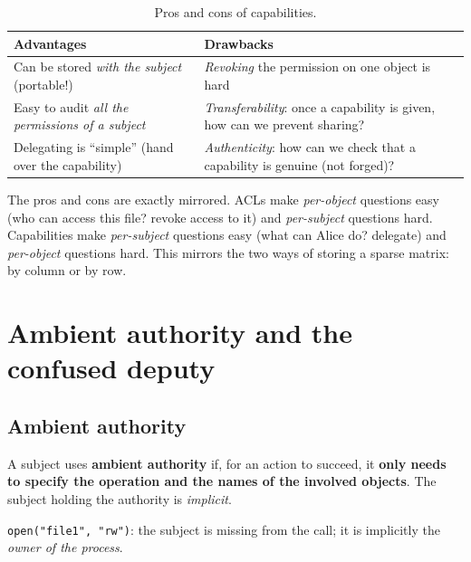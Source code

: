 \vspace{40pt}

\begin{table}[h]
\centering
\begin{tabular}{@{}p{6.3cm}p{6.7cm}@{}}
\toprule
\textbf{Advantages} & \textbf{Drawbacks} \\
\midrule
Can be stored \emph{with the subject} (portable!) & \emph{Revoking} the permission on one object is hard \\
Easy to audit \emph{all the permissions of a subject} & \emph{Transferability}: once a capability is given, how can we prevent sharing? \\
Delegating is ``simple'' (hand over the capability) & \emph{Authenticity}: how can we check that a capability is genuine (not forged)? \\
\bottomrule
\end{tabular}
\caption{Pros and cons of capabilities.}
\end{table}

\begin{remark}
The pros and cons are exactly mirrored. ACLs make \emph{per-object} questions easy (who can access this file? revoke access to it) and \emph{per-subject} questions hard. Capabilities make \emph{per-subject} questions easy (what can Alice do? delegate) and \emph{per-object} questions hard. This mirrors the two ways of storing a sparse matrix: by column or by row.
\end{remark}

\section{Ambient authority and the confused deputy}

\subsection{Ambient authority}

\begin{definition}
A subject uses \textbf{ambient authority} if, for an action to succeed, it \textbf{only needs to specify the operation and the names of the involved objects}. The subject holding the authority is \emph{implicit}.
\end{definition}

\begin{example}
\texttt{open("file1", "rw")}: the subject is missing from the call; it is implicitly the \emph{owner of the process}.
\end{example}

